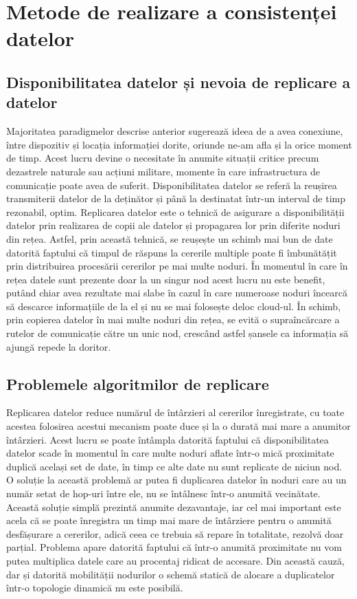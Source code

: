 \documentclass[12pt,a4paper]{report}
\begin{document}
\section{Metode de realizare a consistenței datelor}
\subsection{Disponibilitatea datelor și nevoia de replicare a datelor}
Majoritatea paradigmelor descrise anterior sugerează ideea de a avea conexiune, între dispozitiv și locația informației dorite, oriunde ne-am afla și la orice moment de timp. Acest lucru devine o necesitate în anumite situații critice precum dezastrele naturale sau acțiuni militare, momente în care infrastructura de comunicație poate avea de suferit. Disponibilitatea datelor se referă la reușirea transmiterii datelor de la deținător și până la destinatat într-un interval de timp rezonabil, optim. Replicarea datelor este o tehnică de asigurare a disponibilității datelor prin realizarea de copii ale datelor și propagarea lor prin diferite noduri din rețea. Astfel, prin această tehnică, se reușește un schimb mai bun de date datorită faptului că timpul de răspuns la cererile multiple poate fi îmbunătățit prin distribuirea procesării cererilor pe mai multe noduri. În momentul în care în rețea datele sunt prezente doar la un singur nod acest lucru nu este benefit, putând chiar avea rezultate mai slabe în cazul în care numeroase noduri încearcă să descarce informațiile de la el și nu se mai folosește deloc cloud-ul. În schimb, prin copierea datelor în mai multe noduri din rețea, se evită o supraîncărcare a rutelor de comunicație către un unic nod, crescând astfel șansele ca informația să ajungă repede la doritor. 
\subsection{Problemele algoritmilor de replicare}
Replicarea datelor reduce numărul de întârzieri al cererilor înregistrate, cu toate acestea folosirea acestui mecanism poate duce și la o durată mai mare a anumitor întârzieri. Acest lucru se poate întâmpla datorită faptului că disponibilitatea datelor scade în momentul în care multe noduri aflate într-o mică proximitate duplică același set de date, în timp ce alte date nu sunt replicate de niciun nod. O soluție la această problemă ar putea fi duplicarea datelor în noduri care au un număr setat de hop-uri între ele, nu se întâlnesc într-o anumită vecinătate. Această soluție simplă prezintă anumite dezavantaje, iar cel mai important este acela că se poate înregistra un timp mai mare de întârziere pentru o anumită desfășurare a cererilor, adică ceea ce trebuia să repare în totalitate, rezolvă doar parțial. Problema apare datorită faptului că într-o anumită proximitate nu vom putea multiplica datele care au procentaj ridicat de accesare. Din această cauză, dar și datorită mobilității nodurilor o schemă statică de alocare a duplicatelor într-o topologie dinamică nu este posibilă.
\end{document}
